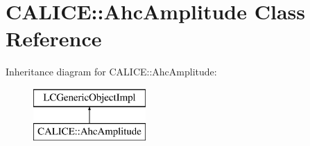 \section{C\-A\-L\-I\-C\-E\-:\-:Ahc\-Amplitude Class Reference}
\label{classCALICE_1_1AhcAmplitude}
Inheritance diagram for C\-A\-L\-I\-C\-E\-:\-:Ahc\-Amplitude\-:\begin{figure}[H]
\begin{center}
\leavevmode
\includegraphics[height=2.000000cm]{classCALICE_1_1AhcAmplitude}
\end{center}
\end{figure}
